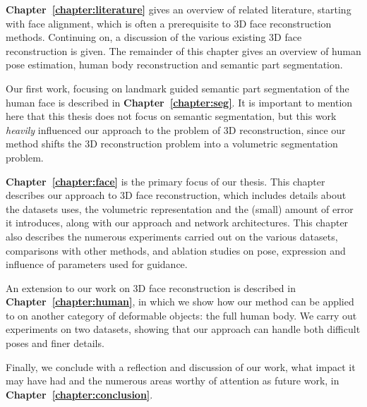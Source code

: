 \textbf{Chapter~\ref{chapter:literature}} gives an overview of related
literature, starting with face alignment, which is often a
prerequisite to 3D face reconstruction methods. Continuing on, a
discussion of the various existing 3D face reconstruction is
given. The remainder of this chapter gives an overview of human pose
estimation, human body reconstruction and semantic part segmentation.

Our first work, focusing on landmark guided semantic part segmentation
of the human face is described in
\textbf{Chapter~\ref{chapter:seg}}. It is important to mention here
that this thesis does not focus on semantic segmentation, but this
work \textit{heavily} influenced our approach to the problem of 3D
reconstruction, since our method shifts the 3D reconstruction problem
into a volumetric segmentation problem.

\textbf{Chapter~\ref{chapter:face}} is the primary focus of our
thesis. This chapter describes our approach to 3D face reconstruction,
which includes details about the datasets uses, the volumetric
representation and the (small) amount of error it introduces, along
with our approach and network architectures. This chapter also
describes the numerous experiments carried out on the various
datasets, comparisons with other methods, and ablation studies on
pose, expression and influence of parameters used for guidance.

An extension to our work on 3D face reconstruction is described in
\textbf{Chapter~\ref{chapter:human}}, in which we show how our method
can be applied to on another category of deformable objects: the full
human body. We carry out experiments on two datasets, showing that our
approach can handle both difficult poses and finer details.

Finally, we conclude with a reflection and discussion of our work,
what impact it may have had and the numerous areas worthy of attention
as future work, in \textbf{Chapter~\ref{chapter:conclusion}}.

